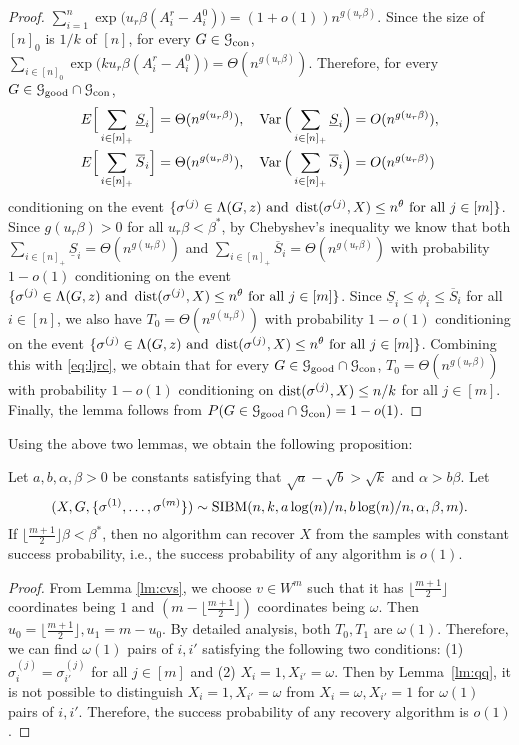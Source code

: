 \documentclass{article}
\begin{document}
\begin{proof}
	$
	\sum_{i=1}^n \exp\big(u_r \beta (A^r_i-A^0_i) \big)
	=(1+o(1)) n^{g( u_r \beta)} .
	$
    Since the size of $[n]_0$ is $1/k$ of $[n]$, for every $G\in \mathcal{G}_{\operatorname{con}}$, 
	$
	\sum_{i\in[n]_0} \exp\big(ku_r \beta (A^r_i-A^0_i) \big)
	=\Theta (n^{g(u_r \beta)}) .
	$
	Therefore, for every $G\in\mathcal{G}_{\operatorname{good}}\cap\mathcal{G}_{\operatorname{con}}$, 
	\begin{align*}
	& E \Big[ \sum_{i\in[n]_+}\underline{S}_i \Big] = \Theta(n^{g(u_r \beta)}) , \quad
	\operatorname{Var} \Big( \sum_{i\in[n]_+}\underline{S}_i \Big) = O( n^{g(u_r\beta)}) , \\
	& E \Big[ \sum_{i\in[n]_+}\overline{S}_i \Big] = \Theta(n^{g(u_r\beta)}) , \quad
	\operatorname{Var} \Big( \sum_{i\in[n]_+}\overline{S}_i \Big) = O( n^{g(u_r\beta)}) 
	\end{align*}
	conditioning on the event $\{\sigma^{(j)}\in  \Lambda(G, z)
	\text{~and~} \operatorname{dist}(\sigma^{(j)}, X) \le n^\theta
	\text{~for all~} j\in[m]\}$. Since $g(u_r\beta)> 0$ for all $u_r\beta< \beta^\ast$, by Chebyshev's inequality we know that both $\sum_{i\in[n]_+}\underline{S}_i=\Theta(n^{g(u_r\beta)})$ and
	$\sum_{i\in[n]_+}\overline{S}_i=\Theta( n^{g(u_r\beta)})$ with probability $1-o(1)$ conditioning on the event $\{\sigma^{(j)}\in  \Lambda(G, z)
	\text{~and~} \operatorname{dist}(\sigma^{(j)}, X) \le n^\theta
	\text{~for all~} j\in[m]\}$.
	Since $\underline{S}_i\le \phi_i\le \overline{S}_i$ for all $i\in[n]$, we also have $T_0=\Theta(n^{g(u_r\beta)})$ with probability $1-o(1)$ conditioning on the event $\{\sigma^{(j)}\in  \Lambda(G, z)
	\text{~and~} \operatorname{dist}(\sigma^{(j)}, X) \le n^\theta
	\text{~for all~} j\in[m]\}$. Combining this with \eqref{eq:ljrc}, we obtain that for every $G\in\mathcal{G}_{\operatorname{good}}\cap\mathcal{G}_{\operatorname{con}}$,
	$T_0=\Theta( n^{g(u_r\beta)})$ with probability $1-o(1)$ conditioning on $\operatorname{dist}(\sigma^{(j)}, X) \le n/k$ for all $j\in[m]$. Finally, the lemma follows from $P(G\in\mathcal{G}_{\operatorname{good}}\cap\mathcal{G}_{\operatorname{con}})=1-o(1)$.
\end{proof}
Using the above two lemmas, we obtain the following proposition:
\begin{proposition}
	Let $a,b,\alpha,\beta> 0$ be constants satisfying that $\sqrt{a}-\sqrt{b} > \sqrt{k}$ and $\alpha>b\beta$. 
	Let 
	$$
	(X,G,\{\sigma^{(1)},\dots,\sigma^{(m)}\})\sim \operatorname{SIBM}(n,k,a\log(n)/n, b\log(n)/n,\alpha,\beta, m) .
	$$
	If $\lfloor\frac{m+1}{2} \rfloor \beta<\beta^\ast$, then no algorithm can recover $X$ from the samples with constant success probability, i.e., the success probability of any algorithm is $o(1)$.
\end{proposition}
\begin{proof}
	From Lemma \ref{lm:cvs}, we choose $v \in W^m$ such that it has $\lfloor \frac{m+1}{2} \rfloor$ coordinates being $1$
	and $(m-\lfloor \frac{m+1}{2} \rfloor)$ coordinates being $\omega$.
	Then $u_0 = \lfloor \frac{m+1}{2} \rfloor, u_1 = m - u_0$.
	By detailed analysis, both $T_0, T_1$ are $\omega(1)$.
	Therefore, we can find $\omega(1)$ pairs of $i, i'$ satisfying the following two conditions: (1) $\sigma_{i}^{(j)}=\sigma_{i'}^{(j)}$ for all $j\in[m]$ and
	(2) $X_i = 1, X_{i'} = \omega$.
	Then by Lemma~\ref{lm:qq}, it is not possible to distinguish $X_i = 1, X_{i'} = \omega$ from $X_i = \omega, X_{i'} = 1$
	for $\omega(1)$ pairs of $i, i'$.
	Therefore, the success probability of any recovery algorithm is $o(1)$.
\end{proof}
\end{document}

